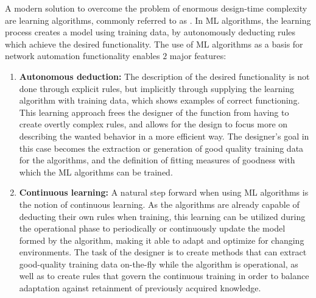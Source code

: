 			A modern solution to overcome the problem of enormous design-time complexity are learning algorithms, commonly referred to as .
			In \ac{ML} algorithms, the learning process creates a model using training data, by autonomously deducting rules which achieve the desired functionality.
			The use of \ac{ML} algorithms as a basis for network automation functionality enables $2$ major features:
			\begin{enumerate}[label=\textbf{\alph*})]
				\item \textbf{Autonomous deduction:}
					The description of the desired functionality is not done through explicit rules, but implicitly through supplying the learning algorithm with training data, which shows examples of correct functioning.
					This learning approach frees the designer of the function from having to create overtly complex rules, and allows for the design to focus more on describing the wanted behavior in a more efficient way.
					The designer's goal in this case becomes the extraction or generation of good quality training data for the algorithms, and the definition of fitting measures of goodness with which the \ac{ML} algorithms can be trained.
				
				\item \textbf{Continuous learning:}
					A natural step forward when using \ac{ML} algorithms is the notion of continuous learning.
					As the algorithms are already capable of deducting their own rules when training, this learning can be utilized during the operational phase to periodically or continuously update the model formed by the algorithm, making it able to adapt and optimize for changing environments.
					The task of the designer is to create methods that can extract good-quality training data on-the-fly while the algorithm is operational, as well as to create rules that govern the continuous training in order to balance adaptation against retainment of previously acquired knowledge.
			\end{enumerate}
		
